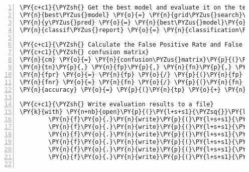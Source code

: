 \documentclass[12pt]{article}
\begin{document}
\begin{Verbatim}[commandchars=\\\{\},numbers=left,firstnumber=1,stepnumber=1,formatcom=\footnotesize]
\PY{c+c1}{\PYZsh{} Get the best model and evaluate it on the test set}
\PY{n}{best\PYZus{}model} \PY{o}{=} \PY{n}{grid\PYZus{}search}\PY{o}{.}\PY{n}{best\PYZus{}estimator\PYZus{}}
\PY{n}{y\PYZus{}pred} \PY{o}{=} \PY{n}{best\PYZus{}model}\PY{o}{.}\PY{n}{predict}\PY{p}{(}\PY{n}{X\PYZus{}test}\PY{p}{)}
\PY{n}{classif\PYZus{}report} \PY{o}{=} \PY{n}{classification\PYZus{}report}\PY{p}{(}\PY{n}{y\PYZus{}test}\PY{p}{,} \PY{n}{y\PYZus{}pred}\PY{p}{)}

\PY{c+c1}{\PYZsh{} Calculate the False Positive Rate and False Negative Rate from the}
\PY{c+c1}{\PYZsh{} confusion matrix}
\PY{n}{cm} \PY{o}{=} \PY{n}{confusion\PYZus{}matrix}\PY{p}{(}\PY{n}{y\PYZus{}test}\PY{p}{,} \PY{n}{y\PYZus{}pred}\PY{p}{)}
\PY{n}{tn}\PY{p}{,} \PY{n}{fp}\PY{p}{,} \PY{n}{fn}\PY{p}{,} \PY{n}{tp} \PY{o}{=} \PY{n}{cm}\PY{o}{.}\PY{n}{ravel}\PY{p}{(}\PY{p}{)}
\PY{n}{fpr} \PY{o}{=} \PY{n}{fp} \PY{o}{/} \PY{p}{(}\PY{n}{fp} \PY{o}{+} \PY{n}{tn}\PY{p}{)}
\PY{n}{fnr} \PY{o}{=} \PY{n}{fn} \PY{o}{/} \PY{p}{(}\PY{n}{fn} \PY{o}{+} \PY{n}{tp}\PY{p}{)}
\PY{n}{accuracy} \PY{o}{=} \PY{p}{(}\PY{n}{tp} \PY{o}{+} \PY{n}{tn}\PY{p}{)} \PY{o}{/} \PY{p}{(}\PY{n}{tp} \PY{o}{+} \PY{n}{tn} \PY{o}{+} \PY{n}{fp} \PY{o}{+} \PY{n}{fn}\PY{p}{)}

\PY{c+c1}{\PYZsh{} Write evaluation results to a file}
\PY{k}{with} \PY{n+nb}{open}\PY{p}{(}\PY{l+s+s1}{\PYZsq{}}\PY{l+s+s1}{results.txt}\PY{l+s+s1}{\PYZsq{}}\PY{p}{,} \PY{l+s+s1}{\PYZsq{}}\PY{l+s+s1}{w}\PY{l+s+s1}{\PYZsq{}}\PY{p}{)} \PY{k}{as} \PY{n}{f}\PY{p}{:}
        \PY{n}{f}\PY{o}{.}\PY{n}{write}\PY{p}{(}\PY{l+s+s1}{\PYZsq{}}\PY{l+s+s1}{Best model: }\PY{l+s+s1}{\PYZsq{}} \PY{o}{+} \PY{n+nb}{str}\PY{p}{(}\PY{n}{best\PYZus{}model}\PY{p}{)} \PY{o}{+} \PY{l+s+s1}{\PYZsq{}}\PY{l+s+se}{\PYZbs{}n}\PY{l+s+se}{\PYZbs{}n}\PY{l+s+s1}{\PYZsq{}}\PY{p}{)}
        \PY{n}{f}\PY{o}{.}\PY{n}{write}\PY{p}{(}\PY{l+s+s1}{\PYZsq{}}\PY{l+s+s1}{Classification Report:}\PY{l+s+se}{\PYZbs{}n}\PY{l+s+s1}{\PYZsq{}} \PY{o}{+} \PY{n}{classif\PYZus{}report} \PY{o}{+} \PY{l+s+s1}{\PYZsq{}}\PY{l+s+se}{\PYZbs{}n}\PY{l+s+s1}{\PYZsq{}}\PY{p}{)}
        \PY{n}{f}\PY{o}{.}\PY{n}{write}\PY{p}{(}\PY{l+s+s1}{\PYZsq{}}\PY{l+s+s1}{Confusion Matrix: }\PY{l+s+se}{\PYZbs{}n}\PY{l+s+s1}{\PYZsq{}} \PY{o}{+} \PY{n+nb}{str}\PY{p}{(}\PY{n}{cm}\PY{p}{)} \PY{o}{+} \PY{l+s+s1}{\PYZsq{}}\PY{l+s+se}{\PYZbs{}n}\PY{l+s+s1}{\PYZsq{}}\PY{p}{)}
        \PY{n}{f}\PY{o}{.}\PY{n}{write}\PY{p}{(}\PY{l+s+s1}{\PYZsq{}}\PY{l+s+s1}{False Positive Rate: }\PY{l+s+s1}{\PYZsq{}} \PY{o}{+} \PY{n+nb}{str}\PY{p}{(}\PY{n}{fpr}\PY{p}{)} \PY{o}{+} \PY{l+s+s1}{\PYZsq{}}\PY{l+s+se}{\PYZbs{}n}\PY{l+s+s1}{\PYZsq{}}\PY{p}{)}
        \PY{n}{f}\PY{o}{.}\PY{n}{write}\PY{p}{(}\PY{l+s+s1}{\PYZsq{}}\PY{l+s+s1}{False Negative Rate: }\PY{l+s+s1}{\PYZsq{}} \PY{o}{+} \PY{n+nb}{str}\PY{p}{(}\PY{n}{fnr}\PY{p}{)} \PY{o}{+} \PY{l+s+s1}{\PYZsq{}}\PY{l+s+se}{\PYZbs{}n}\PY{l+s+s1}{\PYZsq{}}\PY{p}{)}
        \PY{n}{f}\PY{o}{.}\PY{n}{write}\PY{p}{(}\PY{l+s+s1}{\PYZsq{}}\PY{l+s+s1}{Accuracy: }\PY{l+s+s1}{\PYZsq{}} \PY{o}{+} \PY{n+nb}{str}\PY{p}{(}\PY{n}{accuracy}\PY{p}{)} \PY{o}{+} \PY{l+s+s1}{\PYZsq{}}\PY{l+s+se}{\PYZbs{}n}\PY{l+s+se}{\PYZbs{}n}\PY{l+s+s1}{\PYZsq{}}\PY{p}{)}


\end{Verbatim}
\end{document}
